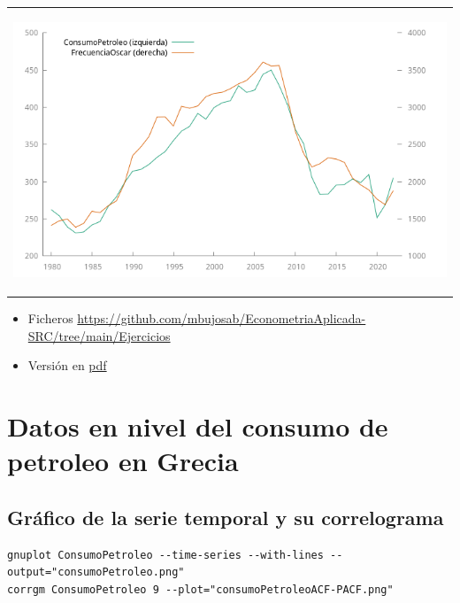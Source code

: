 \documentclass[10pt]{article}
\begin{document}
\begin{center}
\begin{tabular}{l}
\begin{center}
\includegraphics[width=.9\linewidth]{./NombreOscarYConsumoDePetroleo/PetroleoOscar.png}
\end{center}\\
\end{tabular}
\end{center}


\begin{itemize}
\item Ficheros \url{https://github.com/mbujosab/EconometriaAplicada-SRC/tree/main/Ejercicios}
\item Versión en \href{https://github.com/mbujosab/EconometriaAplicada-SRC/blob/main/NombreOscarYConsumoDePetroleo.pdf}{pdf}
\end{itemize}
\section*{Datos en nivel del consumo de petroleo en Grecia}
\label{sec:orgcdef635}
\subsection*{Gráfico de la serie temporal y su correlograma}
\label{sec:orgd125089}

\begin{verbatim}
gnuplot ConsumoPetroleo --time-series --with-lines --output="consumoPetroleo.png"
corrgm ConsumoPetroleo 9 --plot="consumoPetroleoACF-PACF.png"
\end{verbatim}
\end{document}
